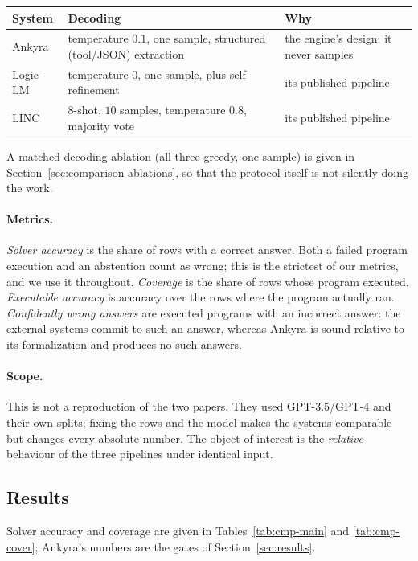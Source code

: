 \documentclass[11pt,a4paper]{article}
\begin{document}
\begin{center}
\small
\begin{tabular}{p{1.7cm}p{6.3cm}p{6.5cm}}
\toprule
\textbf{System} & \textbf{Decoding} & \textbf{Why} \\
\midrule
Ankyra & temperature $0.1$, one sample, structured (tool/JSON) extraction & the engine's design; it never samples \\
Logic-LM & temperature $0$, one sample, plus self-refinement & its published pipeline \\
LINC & 8-shot, $10$ samples, temperature $0.8$, majority vote & its published pipeline \\
\bottomrule
\end{tabular}
\end{center}

A matched-decoding ablation (all three greedy, one sample) is given in
Section~\ref{sec:comparison-ablations}, so that the protocol itself is not silently doing
the work.

\paragraph{Metrics.} \emph{Solver accuracy} is the share of rows with a correct answer.
Both a failed program execution and an abstention count as wrong; this is the strictest of
our metrics, and we use it throughout. \emph{Coverage} is the share of rows whose program
executed. \emph{Executable accuracy} is accuracy over the rows where the program actually
ran. \emph{Confidently wrong answers} are executed programs with an incorrect answer: the
external systems commit to such an answer, whereas Ankyra is sound relative to its
formalization and produces no such answers.

\paragraph{Scope.} This is not a reproduction of the two papers. They used GPT-3.5/GPT-4
and their own splits; fixing the rows and the model makes the systems comparable but
changes every absolute number. The object of interest is the \emph{relative} behaviour of
the three pipelines under identical input.

\subsection{Results}
\label{sec:comparison-results}

Solver accuracy and coverage are given in Tables~\ref{tab:cmp-main} and
\ref{tab:cmp-cover}; Ankyra's numbers are the gates of Section~\ref{sec:results}.
\end{document}
